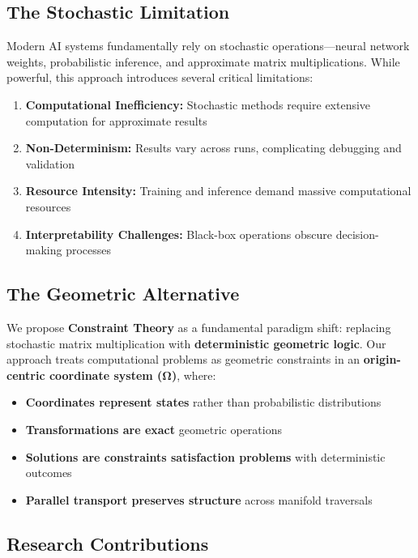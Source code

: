 \documentclass{article}
\begin{document}
\subsection{The Stochastic Limitation}

Modern AI systems fundamentally rely on stochastic operations—neural network weights, probabilistic inference, and approximate matrix multiplications. While powerful, this approach introduces several critical limitations:

\begin{enumerate}
    \item \textbf{Computational Inefficiency:} Stochastic methods require extensive computation for approximate results
    \item \textbf{Non-Determinism:} Results vary across runs, complicating debugging and validation
    \item \textbf{Resource Intensity:} Training and inference demand massive computational resources
    \item \textbf{Interpretability Challenges:} Black-box operations obscure decision-making processes
\end{enumerate}

\subsection{The Geometric Alternative}

We propose \textbf{Constraint Theory} as a fundamental paradigm shift: replacing stochastic matrix multiplication with \textbf{deterministic geometric logic}. Our approach treats computational problems as geometric constraints in an \textbf{origin-centric coordinate system (Ω)}, where:

\begin{itemize}
    \item \textbf{Coordinates represent states} rather than probabilistic distributions
    \item \textbf{Transformations are exact} geometric operations
    \item \textbf{Solutions are constraints satisfaction problems} with deterministic outcomes
    \item \textbf{Parallel transport preserves structure} across manifold traversals
\end{itemize}

\subsection{Research Contributions}
\end{document}
